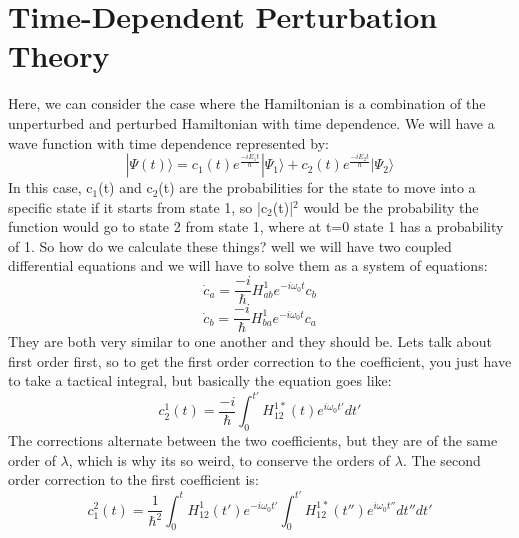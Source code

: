 \documentclass[garamond]{article}
\begin{document}
\section{Time-Dependent Perturbation Theory}
Here, we can consider the case where the Hamiltonian is a combination of the unperturbed and perturbed Hamiltonian with time dependence. We will have a wave function with time dependence represented by:
\begin{equation}
|\Psi(t)\rangle=c_1(t)e^\frac{-iE_1t}{\hbar}|\Psi_1\rangle+c_2(t)e^\frac{-iE_2t}{\hbar}|\Psi_2\rangle
\end{equation}
In this case, c$_1$(t) and c$_2$(t) are the probabilities for the state to move into a specific state if it starts from state 1, so |c$_2$(t)|$^2$ would be the probability the function would go to state 2 from state 1, where at t=0 state 1 has a probability of 1. So how do we calculate these things? well we will have two coupled differential equations and we will have to solve them as a system of equations:
\begin{equation}
\dot{c}_a=\frac{-i}{\hbar}H^1_{ab}e^{-i\omega_0t}c_b
\end{equation}
\begin{equation}
\dot{c}_b=\frac{-i}{\hbar}H^1_{ba}e^{-i\omega_0t}c_a
\end{equation}
They are both very similar to one another and they should be. Lets talk about first order first, so to get the first order correction to the coefficient, you just have to take a tactical integral, but basically the equation goes like:
\begin{equation}
c_2^1(t)=\frac{-i}{\hbar}\int_{0}^{t'}H^{1*}_{12}(t)e^{i\omega_0t'}dt'
\end{equation}
The corrections alternate between the two coefficients, but they are of the same order of $\lambda$, which is why its so weird, to conserve the orders of $\lambda$. The second order correction to the first coefficient is:
\begin{equation}
c_1^2(t)=\frac{1}{\hbar^2}\int_{0}^{t}H^1_{12}(t')e^{-i\omega_0t'}\int_{0}^{t'}H^{1*}_{12}(t'')e^{i\omega_0t''}dt''dt'
\end{equation}
\end{document}
